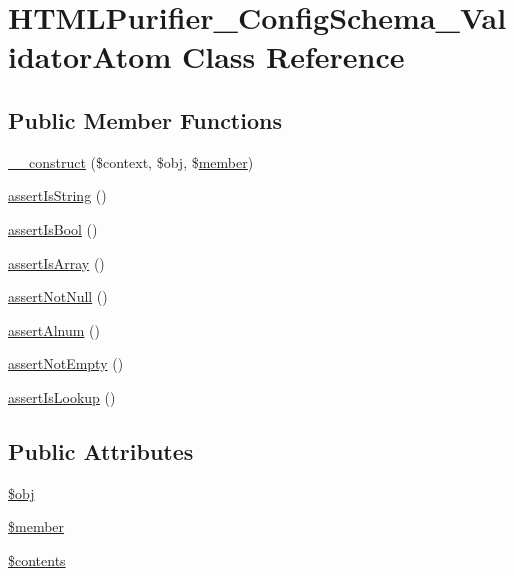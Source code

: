 \hypertarget{classHTMLPurifier__ConfigSchema__ValidatorAtom}{\section{H\+T\+M\+L\+Purifier\+\_\+\+Config\+Schema\+\_\+\+Validator\+Atom Class Reference}
\label{classHTMLPurifier__ConfigSchema__ValidatorAtom}
}
\subsection*{Public Member Functions}
\begin{DoxyCompactItemize}
\item 
\hyperlink{classHTMLPurifier__ConfigSchema__ValidatorAtom_a4b3a7a5daa7e3b5dc5e4cf1a858a9890}{\+\_\+\+\_\+construct} (\$context, \$obj, \$\hyperlink{classmember}{member})
\item 
\hyperlink{classHTMLPurifier__ConfigSchema__ValidatorAtom_a4f1ced620263ecff29fe1de2c3c64948}{assert\+Is\+String} ()
\item 
\hyperlink{classHTMLPurifier__ConfigSchema__ValidatorAtom_a774d225528520d0390da05d74e9a3cff}{assert\+Is\+Bool} ()
\item 
\hyperlink{classHTMLPurifier__ConfigSchema__ValidatorAtom_a1889f7ab4fb553d40f0e3878eb0fe39a}{assert\+Is\+Array} ()
\item 
\hyperlink{classHTMLPurifier__ConfigSchema__ValidatorAtom_a29fe9499d6cae2a39a7781d09b7b0d2d}{assert\+Not\+Null} ()
\item 
\hyperlink{classHTMLPurifier__ConfigSchema__ValidatorAtom_a322057579a6b3de50bce56f5b738ecfb}{assert\+Alnum} ()
\item 
\hyperlink{classHTMLPurifier__ConfigSchema__ValidatorAtom_a587fbee60b847ffa713f6f67fb72a2e5}{assert\+Not\+Empty} ()
\item 
\hyperlink{classHTMLPurifier__ConfigSchema__ValidatorAtom_a41929b0ca0058c6006be602a10b6726e}{assert\+Is\+Lookup} ()
\end{DoxyCompactItemize}
\subsection*{Public Attributes}
\begin{DoxyCompactItemize}
\item 
\hyperlink{classHTMLPurifier__ConfigSchema__ValidatorAtom_a2e7dd0e83aa5f66cb5ca1da3f28dc05e}{\$obj}
\item 
\hyperlink{classHTMLPurifier__ConfigSchema__ValidatorAtom_af524e276d540c814e14e821fdb33c957}{\$member}
\item 
\hyperlink{classHTMLPurifier__ConfigSchema__ValidatorAtom_a4adf2499d158d09eeca2a172cb90f381}{\$contents}
\end{DoxyCompactItemize}
